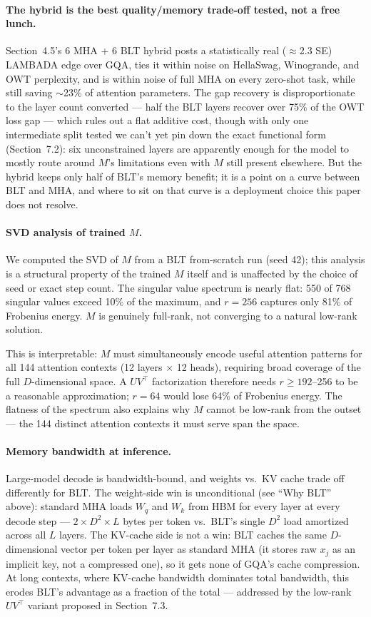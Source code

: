 \documentclass[11pt]{article}
\begin{document}
\paragraph{The hybrid is the best quality/memory trade-off tested, not a free lunch.} Section~4.5's 6 MHA + 6 BLT hybrid posts a statistically real ($\approx$2.3 SE) LAMBADA edge over GQA, ties it within noise on HellaSwag, Winogrande, and OWT perplexity, and is within noise of full MHA on every zero-shot task, while still saving $\sim$23\% of attention parameters. The gap recovery is disproportionate to the layer count converted --- half the BLT layers recover over 75\% of the OWT loss gap --- which rules out a flat additive cost, though with only one intermediate split tested we can't yet pin down the exact functional form (Section~7.2): six unconstrained layers are apparently enough for the model to mostly route around $M$'s limitations even with $M$ still present elsewhere. But the hybrid keeps only half of BLT's memory benefit; it is a point on a curve between BLT and MHA, and where to sit on that curve is a deployment choice this paper does not resolve.

\paragraph{SVD analysis of trained $M$.} We computed the SVD of $M$ from a BLT from-scratch run (seed 42); this analysis is a structural property of the trained $M$ itself and is unaffected by the choice of seed or exact step count. The singular value spectrum is nearly flat: 550 of 768 singular values exceed 10\% of the maximum, and $r=256$ captures only 81\% of Frobenius energy. $M$ is genuinely full-rank, not converging to a natural low-rank solution.

This is interpretable: $M$ must simultaneously encode useful attention patterns for all 144 attention contexts (12 layers $\times$ 12 heads), requiring broad coverage of the full $D$-dimensional space. A $UV^\top$ factorization therefore needs $r \geq 192$--256 to be a reasonable approximation; $r=64$ would lose 64\% of Frobenius energy. The flatness of the spectrum also explains why $M$ cannot be low-rank from the outset --- the 144 distinct attention contexts it must serve span the space.

\paragraph{Memory bandwidth at inference.} Large-model decode is bandwidth-bound, and weights vs.\ KV cache trade off differently for BLT. The weight-side win is unconditional (see ``Why BLT'' above): standard MHA loads $W_q$ and $W_k$ from HBM for every layer at every decode step --- $2 \times D^2 \times L$ bytes per token vs.\ BLT's single $D^2$ load amortized across all $L$ layers. The KV-cache side is not a win: BLT caches the same $D$-dimensional vector per token per layer as standard MHA (it stores raw $x_j$ as an implicit key, not a compressed one), so it gets none of GQA's cache compression. At long contexts, where KV-cache bandwidth dominates total bandwidth, this erodes BLT's advantage as a fraction of the total --- addressed by the low-rank $UV^\top$ variant proposed in Section~7.3.
\end{document}

